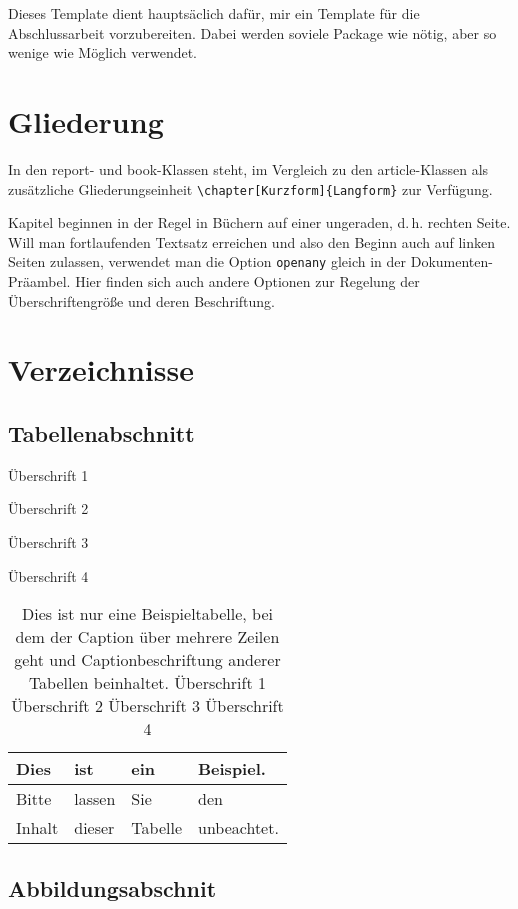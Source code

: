 \documentclass[a4paper,
	twoside,
	openany,							%
	headsepline,					%
	footsepline,					%
	headings = normal,
	toc  	 = chapterentrywithdots,
	listof = totoc,
	listof = entryprefix,
	bibliography = totoc	%
]
{scrbook}
\begin{document}
Dieses Template dient hauptsäclich dafür, mir ein Template für die Abschlussarbeit vorzubereiten. Dabei werden soviele Package wie nötig, aber so wenige wie Möglich verwendet.

\mainmatter						%

\chapter{Gliederung}

In den report- und book-Klassen steht, im Vergleich zu den article-Klassen als zusätzliche Gliederungseinheit \verb#\chapter[Kurzform]{Langform}# zur Verfügung. 

Kapitel beginnen in der Regel in Büchern auf einer ungeraden, d.\,h. rechten Seite. Will man fortlaufenden Textsatz erreichen und also den Beginn auch auf linken Seiten zulassen, verwendet man die Option \verb#openany# gleich in der Dokumenten-Präambel. Hier finden sich auch andere Optionen zur Regelung der Überschriftengröße und deren Beschriftung.

\chapter{Verzeichnisse}
\label{sec:Verzeichnisse}
\section{Tabellenabschnitt}
\label{sec:Tabellenabschnitt}

\begin{table}[h!]
	\caption{Überschrift 1}
	\caption{Überschrift 2}
	\caption{Überschrift 3}
	\caption{Überschrift 4}
	\caption{Dies ist nur eine Beispieltabelle, bei dem der Caption über mehrere Zeilen geht und Captionbeschriftung anderer Tabellen beinhaltet. Überschrift 1 Überschrift 2 Überschrift 3 Überschrift 4}
	\centering
	\begin{tabular}{|l|l|l|l|}\hline
		Dies & ist & ein & Beispiel.\\\hline
		Bitte & lassen & Sie & den \\\hline
		Inhalt & dieser & Tabelle & unbeachtet.\\\hline
	\end{tabular}
\end{table}

	\section{Abbildungsabschnit}
	\label{sec:Abbildungsabschnit}
\end{document}
